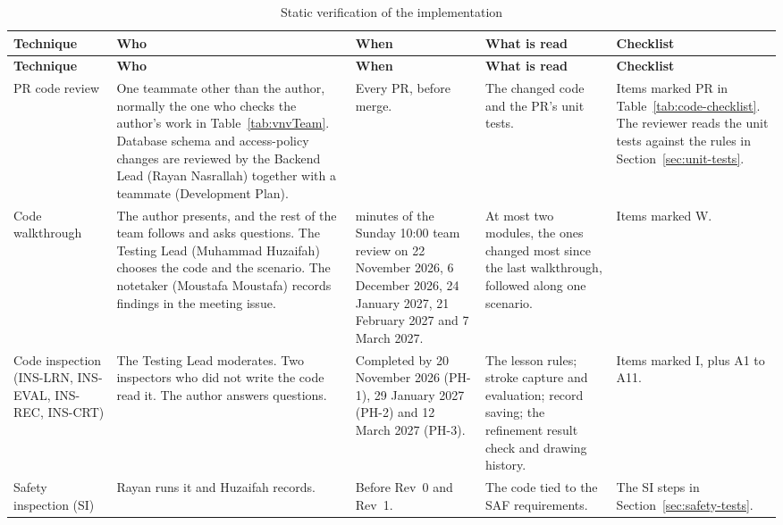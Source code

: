 \documentclass[12pt, titlepage]{article}
\begin{document}
{\small
\begin{longtable}{@{}>{\raggedright\arraybackslash}p{}%
>{\raggedright\arraybackslash}p{}%
>{\raggedright\arraybackslash}p{}%
>{\raggedright\arraybackslash}p{}%
>{\raggedright\arraybackslash}p{}@{}}
\caption{Static verification of the implementation}
\label{tab:static-verif}\\
\toprule
\textbf{Technique} & \textbf{Who} & \textbf{When} & \textbf{What is read} &
\textbf{Checklist}\\
\midrule
\endfirsthead
\toprule
\textbf{Technique} & \textbf{Who} & \textbf{When} & \textbf{What is read} &
\textbf{Checklist}\\
\midrule
\endhead
PR code review & One teammate other than the author, normally the one who
checks the author's work in Table~\ref{tab:vnvTeam}. Database schema and
access-policy changes are reviewed by the Backend Lead (Rayan Nasrallah)
together with a teammate (Development Plan). & Every PR, before merge. &
The changed code and the PR's unit tests. & Items marked PR in
Table~\ref{tab:code-checklist}. The reviewer reads the unit tests against
the rules in Section~\ref{sec:unit-tests}.\\
\addlinespace
Code walkthrough & The author presents, and the rest of the team follows and
asks questions. The Testing Lead (Muhammad Huzaifah) chooses the code and
the scenario. The notetaker (Moustafa Moustafa) records findings in the
meeting issue. & 45 minutes of the Sunday 10:00 team review on
22 November 2026, 6 December 2026, 24 January 2027, 21 February 2027 and
7 March 2027.
& At most two modules, the ones changed most since the last walkthrough,
followed along one scenario. & Items marked W.\\
\addlinespace
Code inspection (INS-LRN, INS-EVAL, INS-REC, INS-CRT) & The Testing Lead
moderates. Two inspectors who did not write the code read it. The author
answers questions. & Completed by 20 November 2026 (PH-1), 29 January 2027
(PH-2) and 12 March 2027 (PH-3). & The lesson rules; stroke capture and
evaluation; record saving; the refinement result check and drawing history.
& Items marked I, plus A1 to A11.\\
\addlinespace
Safety inspection (SI) & Rayan runs it and Huzaifah records. & Before Rev~0
and Rev~1. & The code tied to the SAF requirements. & The SI steps in
Section~\ref{sec:safety-tests}.\\
\bottomrule
\end{longtable}}
\end{document}
